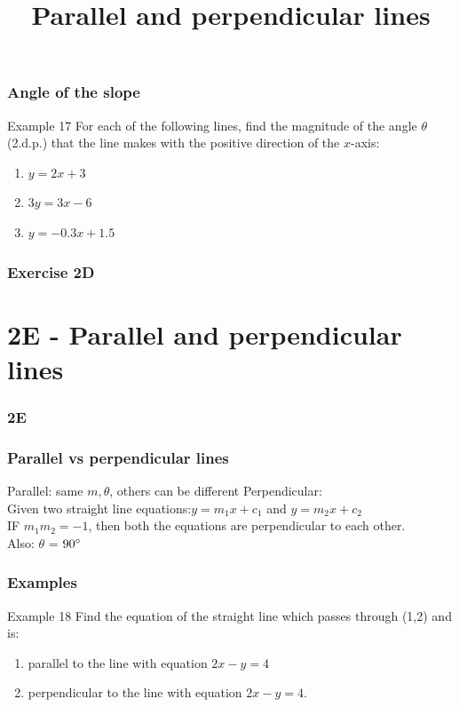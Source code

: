 \documentclass{beamer}
\newcommand{\blank}{\begin{frame}
\end{frame}}
\begin{document}
\begin{frame}[t]
    \frametitle{Angle of the slope}
    \begin{block}{Example 17}
        For each of the following lines, find the magnitude of the angle $\theta$ (2.d.p.) that the line makes with the positive direction of the $x$-axis:\\
        \begin{enumerate}
            \item $y = 2x+3$
            \item $3y = 3x-6$
            \item $y = -0.3x + 1.5$
        \end{enumerate}
    \end{block}
\end{frame}
\blank

\begin{frame}
    \frametitle{Exercise 2D}
\end{frame}

\section{2E - Parallel and perpendicular lines}
\begin{frame}
    \frametitle{2E}
    \begin{center}
        \title{Parallel and perpendicular lines}
        \maketitle
    \end{center}
\end{frame}

\begin{frame}
    \frametitle{Parallel vs perpendicular lines}
    Parallel: same $m, \theta$, others can be different
    Perpendicular: \\
    Given two straight line equations:$y = m_1x + c_1$ and $y = m_2x + c_2$\\
    IF $m_1m_2 = -1$, then both the equations are perpendicular to each other.\\
    Also: $\theta$ = $90 \degree$
\end{frame}

\begin{frame}[t]
    \frametitle{Examples}
    \begin{block}{Example 18}
        Find the equation of the straight line which passes through (1,2) and is:\\
        \begin{enumerate}
            \item parallel to the line with equation $2x - y = 4$
            \item perpendicular to the line with equation $2x - y = 4$.
        \end{enumerate}
    \end{block}
\end{frame}
\end{document}
